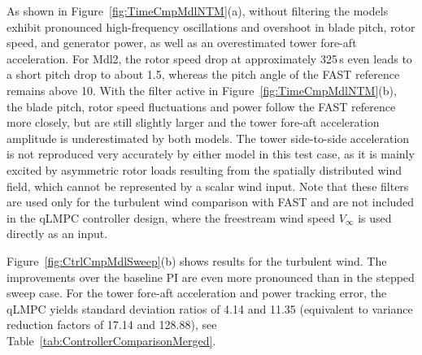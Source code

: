 As shown in Figure~\ref{fig:TimeCmpMdlNTM}(a), without filtering the models exhibit pronounced high-frequency oscillations and overshoot in blade pitch, rotor speed, and generator power, as well as an overestimated tower fore-aft acceleration. For Mdl2, the rotor speed drop at approximately 325\,s even leads to a short pitch drop to about 1.5\textdegree, whereas the pitch angle of the FAST reference remains above 10\textdegree. With the filter active in Figure~\ref{fig:TimeCmpMdlNTM}(b), the blade pitch,  rotor speed fluctuations and power follow the FAST reference more closely, but are still slightly larger and the tower fore-aft acceleration amplitude is underestimated by both models. The tower side-to-side acceleration is not reproduced very accurately by either model in this test case, as it is mainly excited by asymmetric rotor loads resulting from the spatially distributed wind field, which cannot be represented by a scalar wind input. Note that these filters are used only for the turbulent wind comparison with FAST and are not included in the qLMPC controller design, where the freestream wind speed $V_\infty$ is used directly as an input.


Figure~\ref{fig:CtrlCmpMdlSweep}(b) shows results for the turbulent wind. The improvements over the baseline PI are even more pronounced than in the stepped sweep case. For the tower fore-aft acceleration and power tracking error, the qLMPC yields standard deviation ratios of 4.14 and 11.35 (equivalent to variance reduction factors of 17.14 and 128.88), see Table~\ref{tab:ControllerComparisonMerged}.

